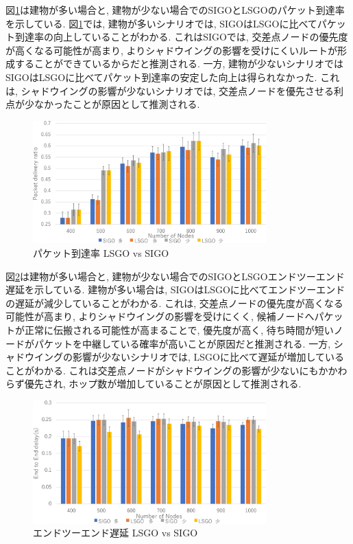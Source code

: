 \documentclass[technicalreport]{ieicej}
\begin{document}
図\ref{fig:PDR}は建物が多い場合と, 建物が少ない場合でのSIGOとLSGOのパケット到達率を示している. 図\ref{fig:PDR}では, 建物が多いシナリオでは, SIGOはLSGOに比べてパケット到達率の向上していることがわかる. これはSIGOでは, 交差点ノードの優先度が高くなる可能性が高まり, よりシャドウイングの影響を受けにくいルートが形成することができているからだと推測される. 
一方, 建物が少ないシナリオではSIGOはLSGOに比べてパケット到達率の安定した向上は得られなかった. これは, シャドウイングの影響が少ないシナリオでは, 交差点ノードを優先させる利点が少なかったことが原因として推測される. 

\begin{figure}[!ht]
\centering
\includegraphics[width=90mm]{figures/PDR.eps}
\caption{パケット到達率 LSGO vs SIGO}
\label{fig:PDR}
\end{figure}


 図\ref{fig:Delay}は建物が多い場合と, 建物が少ない場合でのSIGOとLSGOエンドツーエンド遅延を示している. 建物が多い場合は, SIGOはLSGOに比べてエンドツーエンドの遅延が減少していることがわかる. これは, 交差点ノードの優先度が高くなる可能性が高まり, よりシャドウイングの影響を受けにくく, 候補ノードへパケットが正常に伝搬される可能性が高まることで, 優先度が高く, 待ち時間が短いノードがパケットを中継している確率が高いことが原因だと推測される. 一方, シャドウイングの影響が少ないシナリオでは, LSGOに比べて遅延が増加していることがわかる. これは交差点ノードがシャドウイングの影響が少ないにもかかわらず優先され, ホップ数が増加していることが原因として推測される. 
 
 \begin{figure}[!ht]
\centering
\includegraphics[width=90mm]{figures/Delay.eps}
\caption{エンドツーエンド遅延 LSGO vs SIGO}
\label{fig:Delay}
\end{figure}
\end{document}
